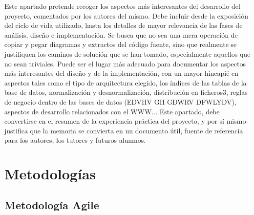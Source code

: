 
Este apartado pretende recoger los aspectos más interesantes del desarrollo del proyecto, comentados por los autores del mismo.
Debe incluir desde la exposición del ciclo de vida utilizado, hasta los detalles de mayor relevancia de las fases de análisis, diseño e implementación.
Se busca que no sea una mera operación de copiar y pegar diagramas y extractos del código fuente, sino que realmente se justifiquen los caminos de solución que se han tomado, especialmente aquellos que no sean triviales.
Puede ser el lugar más adecuado para documentar los aspectos más interesantes del diseño y de la implementación, con un mayor hincapié en aspectos tales como el tipo de arquitectura elegido, los índices de las tablas de la base de datos, normalización y desnormalización, distribución en ficheros3, reglas de negocio dentro de las bases de datos (EDVHV GH GDWRV DFWLYDV), aspectos de desarrollo relacionados con el WWW...
Este apartado, debe convertirse en el resumen de la experiencia práctica del proyecto, y por sí mismo justifica que la memoria se convierta en un documento útil, fuente de referencia para los autores, los tutores y futuros alumnos.

\section{Metodologías}

\subsection{Metodología Agile}

